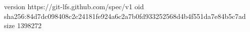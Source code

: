 version https://git-lfs.github.com/spec/v1
oid sha256:84d7dc098408c2c24181fe924a6c2a7b0fd933252568d4b4f551da7e84b5c7ad
size 1398272
